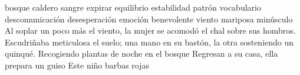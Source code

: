 \markdownRendererInterblockSeparator
{}\markdownRendererBlockQuoteBegin
bosque caldero sangre expirar equilibrio estabilidad patrón vocabulario descomunicación desesperación emoción benevolente viento mariposa minúsculo
\markdownRendererBlockQuoteEnd \markdownRendererInterblockSeparator
{}Al soplar un poco más el viento, la mujer se acomodó el chal sobre sus hombros. Escudriñaba meticulosa el suelo; una mano en su bastón, la otra sosteniendo un quinqué.\markdownRendererInterblockSeparator
{}Recogiendo plantas de noche en el bosque Regresan a su casa, ella prepara un guiso\markdownRendererInterblockSeparator
{}Este niño barbas rojas\relax